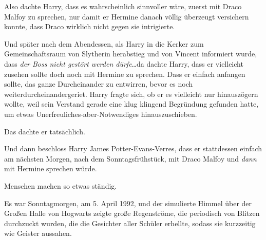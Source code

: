 Also dachte Harry, dass es wahrscheinlich sinnvoller wäre, zuerst mit Draco Malfoy zu sprechen, nur damit er Hermine danach völlig überzeugt versichern konnte, dass Draco wirklich nicht gegen sie intrigierte.

Und später nach dem Abendessen, als Harry in die Kerker zum Gemeinschaftsraum von Slytherin herabstieg und von Vincent informiert wurde, dass \emph{der Boss nicht gestört werden dürfe}…da dachte Harry, dass er vielleicht zusehen sollte doch noch mit Hermine zu sprechen. Dass er einfach anfangen sollte, das ganze Durcheinander zu entwirren, bevor es noch weiterdurcheinandergeriet. Harry fragte sich, ob er es vielleicht nur hinauszögern wollte, weil sein Verstand gerade eine klug klingend Begründung gefunden hatte, um etwas Unerfreuliches-aber-Notwendiges hinauszuschieben.

Das dachte er tatsächlich.

Und dann beschloss Harry James Potter-Evans-Verres, dass er stattdessen einfach am nächsten Morgen, nach dem Sonntagsfrühstück, mit Draco Malfoy und \emph{dann} mit Hermine sprechen würde.

Menschen machen so etwas ständig.

\later

Es war Sonntagmorgen, am 5. April 1992, und der simulierte Himmel über der Großen Halle von Hogwarts zeigte große Regenströme, die periodisch von Blitzen durchzuckt wurden, die die Gesichter aller Schüler erhellte, sodass sie kurzzeitig wie Geister aussahen.

